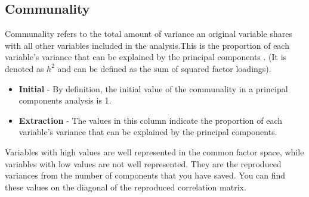 \subsection{Communality} 
Communality refers to the total amount of variance an original variable shares with all other
variables included in the analysis.This is the proportion of each variable's variance that can be explained by the principal components .  (It is denoted as $h^2$ and can be defined as the sum of squared factor loadings).

\begin{itemize}
	\item \textbf{Initial} - By definition, the initial value of the communality in a principal components analysis is 1.
	
	\item \textbf{Extraction}  - The values in this column indicate the proportion of each variable's variance that can be explained by the principal components. 
\end{itemize}
 Variables with high values are well represented in the common factor space, while variables with low values are not well represented. They are the reproduced variances from the number of components that you have saved.  You can find these values on the diagonal of the reproduced correlation matrix.



%
%
%
%
%
%
